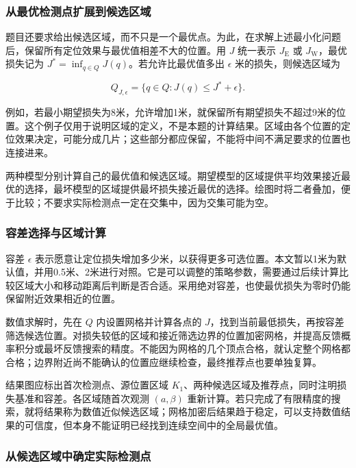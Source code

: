 \documentclass[UTF8,a4paper,zihao=-4,fontset=none]{ctexart}
\begin{document}
\subsubsection{从最优检测点扩展到候选区域}

题目还要求给出候选区域，而不只是一个最优点。为此，在求解上述最小化问题后，保留所有定位效果与最优值相差不大的位置。用 \(J\) 统一表示 \(J_{\mathrm E}\) 或 \(J_{\mathrm W}\)，最优损失记为 \(J^*=\inf_{q\in Q}J(q)\)。若允许比最优值多出 \(\epsilon\) 米的损失，则候选区域为

\begin{equation}
 Q_{J,\epsilon}=\{q\in Q:J(q)\le J^*+\epsilon\}.
 \label{eq:q2-candidate-region}
\end{equation}

例如，若最小期望损失为8米，允许增加1米，就保留所有期望损失不超过9米的位置。这个例子仅用于说明区域的定义，不是本题的计算结果。区域由各个位置的定位效果决定，可能分成几片；这些部分都应保留，不能将中间不满足要求的位置也连接进来。

两种模型分别计算自己的最优值和候选区域。期望模型的区域提供平均效果接近最优的选择，最坏模型的区域提供最坏损失接近最优的选择。绘图时将二者叠加，便于比较；不要求实际检测点一定在交集中，因为交集可能为空。

\subsubsection{容差选择与区域计算}

容差 \(\epsilon\) 表示愿意让定位损失增加多少米，以获得更多可选位置。本文暂以1米为默认值，并用0.5米、2米进行对照。它是可以调整的策略参数，需要通过后续计算比较区域大小和移动距离后判断是否合适。采用绝对容差，也使最优损失为零时仍能保留附近效果相近的位置。

数值求解时，先在 \(Q\) 内设置网格并计算各点的 \(J\)，找到当前最低损失，再按容差筛选候选位置。对损失较低的区域和接近筛选边界的位置加密网格，并提高反馈概率积分或最坏反馈搜索的精度。不能因为网格的几个顶点合格，就认定整个网格都合格；边界附近尚不能确认的位置应继续检查，最终推荐点也要单独复算。

结果图应标出首次检测点、源位置区域 \(K_1\)、两种候选区域及推荐点，同时注明损失基准和容差。各区域随首次观测 \((a,\beta)\) 重新计算。若只完成了有限精度的搜索，就将结果称为数值近似候选区域；网格加密后结果趋于稳定，可以支持数值结果的可信度，但本身不能证明已经找到连续空间中的全局最优值。

\subsubsection{从候选区域中确定实际检测点}
\end{document}
